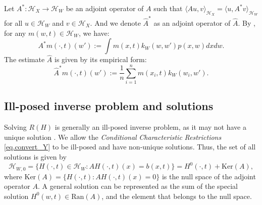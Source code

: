 \documentclass[
  12pt]{article}
\def\to{\rightarrow}
\def\wh{\widehat}
\def\cH{\mathcal{H}}
\begin{document}
Let $A^*: \mathcal{H}_{X} \to \mathcal{H}_{W}$ be an adjoint operator of $A$ such that $\langle Au,v\rangle_{\mathcal{H}_{X}} = \langle u,A^*v\rangle_{\mathcal{H}_{W}}$ for all $u\in\mathcal{H}_{W}$ and $v\in\mathcal{H}_{X}$. And we denote $\widehat{A}^*$ as an adjoint operator of $\widehat{A}$. By \cite{mastouri2021proximal}, for any $m(w,t)\in\mathcal{H}_{W}$, we have:
\begin{equation}\label{eq.operator_defination_adjoin_copy}
    A^*m(\cdot,t)(w'):=\int{m(x,t) k_W(w,w') p(x,w)dxdw}.
\end{equation}
The estimate $\wh{A}$ is given by its empirical form:
\begin{equation}\label{eq.operator_defination_adjoin}
    \widehat{A}^*m(\cdot,t)(w'):=\frac{1}{n}\sum_{i=1}^n{m( x_i,t) k_W(w_i,w')}.
\end{equation}


\subsection{Ill-posed inverse problem and solutions}
Solving $R(H)$ is generally an ill-posed inverse problem, as it may
not have a unique solution \citep{carrasco2007linear}. We allow the \emph{Conditional} \emph{Characteristic} \emph{Restrictions} \eqref{eq.convert_Y} to be ill-posed and have non-unique solutions. Thus, the set of all solutions is given by 
\begin{equation}\label{eq. all_solution}
    \cH_{W,0}=\{H(\cdot,t)\in\mathcal{H}_W:AH(\cdot,t)(x)=b(x,t)\}=H^0(\cdot,t)+\mathrm{Ker}(A),
\end{equation}
where $\mathrm{Ker}(A)=\{H(\cdot,t):AH(\cdot, t)(x)=0\}$ is the null space of the adjoint operator $A$. A general solution can be represented as the sum of the special solution $H^0(w,t)\in \mathrm{Ran}(A)$, and the element that belongs to the null space.
\end{document}
